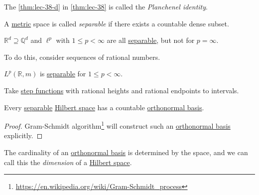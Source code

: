 \begin{note}\label{note:Planchenel-identity}
	The \autoref{thm:lec-38-d} in \autoref{thm:lec-38} is called the \emph{Planchenel identity}.
\end{note}

\begin{definition}[Separable]\label{def:separable}
	A \hyperref[def:metric]{metric} space is called \emph{separable} if there exists a countable dense subset.
\end{definition}

\begin{eg}
	\(\mathbb{R}^d \supseteq \mathbb{Q} ^d\) and \(\ell^p\) with \(1 \leq p < \infty\) are all \hyperref[def:separable]{separable},
	but not for \(p = \infty\).
\end{eg}
\begin{explanation}
	To do this, consider sequences of rational numbers.
\end{explanation}
\begin{eg}
	\(L^p(\mathbb{R},m)\) is \hyperref[def:separable]{separable} for \(1 \leq p < \infty\).
\end{eg}
\begin{explanation}
	Take \hyperref[def:step-function]{step functions} with rational heights and rational endpoints to intervals.
\end{explanation}
\begin{theorem}
	Every \hyperref[def:separable]{separable} \hyperref[def:Hilbert-space]{Hilbert space} has a countable \hyperref[def:orthonormal-basis]{orthonormal basis}.
\end{theorem}
\begin{proof}
	Gram-Schmidt algorithm\footnote{\url{https://en.wikipedia.org/wiki/Gram-Schmidt_process}} will construct such an \hyperref[def:orthonormal-basis]{orthonormal basis}
	explicitly.
\end{proof}

\begin{note}
	The cardinality of an \hyperref[def:orthonormal-basis]{orthonormal basis} is determined by the space, and we can call this the \emph{dimension} of a
	\hyperref[def:Hilbert-space]{Hilbert space}.
\end{note}
